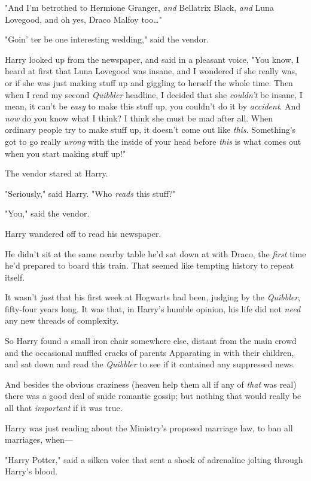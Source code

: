 "And I'm betrothed to Hermione Granger, \emph{and} Bellatrix Black, \emph{and} 
Luna Lovegood, and oh yes, Draco Malfoy too{\ldots}"

"Goin' ter be one interesting wedding," said the vendor.

Harry looked up from the newspaper, and said in a pleasant voice, "You know, I 
heard at first that Luna Lovegood was insane, and I wondered if she really was, 
or if she was just making stuff up and giggling to herself the whole time. Then 
when I read my second \emph{Quibbler} headline, I decided that she 
\emph{couldn't} be insane, I mean, it can't be \emph{easy} to make this stuff 
up, you couldn't do it by \emph{accident}. And \emph{now} do you know what I 
think? I think she must be mad after all. When ordinary people try to make 
stuff up, it doesn't come out like \emph{this}. Something's got to go really 
\emph{wrong} with the inside of your head before \emph{this} is what comes out 
when you start making stuff up!"

The vendor stared at Harry.

"Seriously," said Harry. "Who \emph{reads} this stuff?"

"You," said the vendor.

Harry wandered off to read his newspaper.

He didn't sit at the same nearby table he'd sat down at with Draco, the 
\emph{first} time he'd prepared to board this train. That seemed like tempting 
history to repeat itself.

It wasn't \emph{just} that his first week at Hogwarts had been, judging by the 
\emph{Quibbler}, fifty-four years long. It was that, in Harry's humble opinion, 
his life did not \emph{need} any new threads of complexity.

So Harry found a small iron chair somewhere else, distant from the main crowd 
and the occasional muffled cracks of parents Apparating in with their children, 
and sat down and read the \emph{Quibbler} to see if it contained any suppressed 
news.

And besides the obvious craziness (heaven help them all if any of \emph{that} 
was real) there was a good deal of snide romantic gossip; but nothing that 
would really be all that \emph{important} if it was true.

Harry was just reading about the Ministry's proposed marriage law, to ban all 
marriages, when---

"Harry Potter," said a silken voice that sent a shock of adrenaline jolting 
through Harry's blood.

